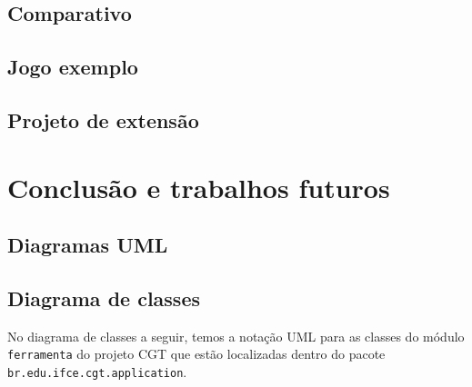 \documentclass[12pt,twoside,openright,a4paper,english,brazil,sumario=tradicional]{abntex2}
\begin{document}
\section{Comparativo}
\section{Jogo exemplo}
\section{Projeto de extensão}

\chapter{Conclusão e trabalhos futuros}
\label{chap:conclcsao}

\begin{apendicesenv}
\partapendices
\chapter{Diagramas UML}
\label{chap:diagramas}

\section{Diagrama de classes}
No diagrama de classes a seguir, temos a notação UML para as classes do módulo \texttt{ferramenta} do projeto CGT que estão localizadas dentro do pacote \texttt{br.edu.ifce.cgt.application}.


\end{apendicesenv}
\end{document}
